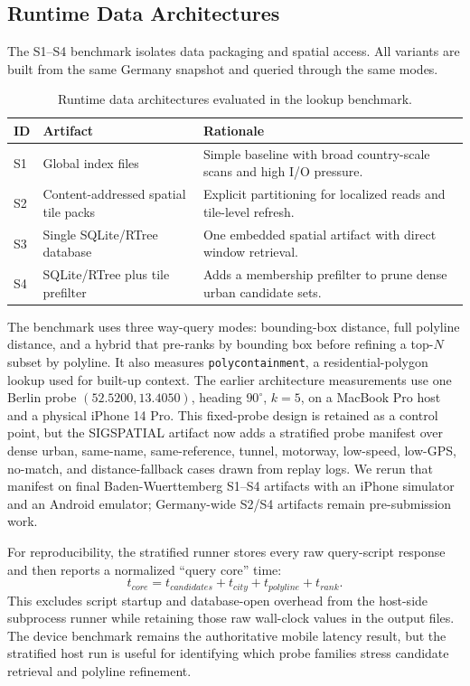 \documentclass[sigconf]{acmart}
\begin{document}
\subsection{Runtime Data Architectures}

The S1--S4 benchmark isolates data packaging and spatial access. All variants are built from the same Germany snapshot and queried through the same modes.

\begin{table}[t]
\caption{Runtime data architectures evaluated in the lookup benchmark.}
\label{tab:architectures}
\centering
\scriptsize
\begin{tabular}{p{0.65cm}p{2.25cm}p{4.65cm}}
\toprule
ID & Artifact & Rationale \\
\midrule
S1 & Global index files & Simple baseline with broad country-scale scans and high I/O pressure. \\
S2 & Content-addressed spatial tile packs & Explicit partitioning for localized reads and tile-level refresh. \\
S3 & Single SQLite/RTree database & One embedded spatial artifact with direct window retrieval. \\
S4 & SQLite/RTree plus tile prefilter & Adds a membership prefilter to prune dense urban candidate sets. \\
\bottomrule
\end{tabular}
\end{table}

The benchmark uses three way-query modes: bounding-box distance, full polyline distance, and a hybrid that pre-ranks by bounding box before refining a top-\(N\) subset by polyline. It also measures \texttt{polycontainment}, a residential-polygon lookup used for built-up context. The earlier architecture measurements use one Berlin probe \((52.5200,13.4050)\), heading \(90^\circ\), \(k=5\), on a MacBook Pro host and a physical iPhone 14 Pro. This fixed-probe design is retained as a control point, but the SIGSPATIAL artifact now adds a stratified probe manifest over dense urban, same-name, same-reference, tunnel, motorway, low-speed, low-GPS, no-match, and distance-fallback cases drawn from replay logs. We rerun that manifest on final Baden-Wuerttemberg S1--S4 artifacts with an iPhone simulator and an Android emulator; Germany-wide S2/S4 artifacts remain pre-submission work.

For reproducibility, the stratified runner stores every raw query-script response and then reports a normalized ``query core'' time:
\[
t_{core}=t_{candidates}+t_{city}+t_{polyline}+t_{rank}.
\]
This excludes script startup and database-open overhead from the host-side subprocess runner while retaining those raw wall-clock values in the output files. The device benchmark remains the authoritative mobile latency result, but the stratified host run is useful for identifying which probe families stress candidate retrieval and polyline refinement.
\end{document}
